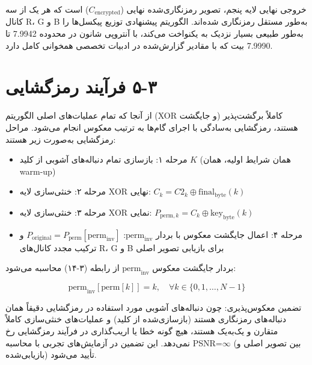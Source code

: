 خروجی نهایی لایه پنجم، تصویر رمزنگاری‌شده نهایی ($C_{\mathrm{encrypted}}$) است که هر یک از سه کانال R، G و B به‌طور مستقل رمزنگاری شده‌اند. الگوریتم پیشنهادی توزیع پیکسل‌ها را به‌طور طبیعی بسیار نزدیک به یکنواخت می‌کند، با آنتروپی شانون در محدوده 7.9942 تا 7.9990 بیت که با مقادیر گزارش‌شده در ادبیات تخصصی همخوانی کامل دارد.

\section{‏۳‏-‏۵‏ فرآیند رمزگشایی}

از آنجا که تمام عملیات‌های اصلی الگوریتم (XOR و جایگشت) کاملاً برگشت‌پذیر هستند، رمزگشایی به‌سادگی با اجرای گام‌ها به ترتیب معکوس انجام می‌شود. مراحل رمزگشایی به‌صورت زیر هستند:

\begin{itemize}
    \item مرحله ۱: بازسازی تمام دنباله‌های آشوبی از کلید $K$ (همان شرایط اولیه، همان warm-up)
\end{itemize}

\begin{itemize}
    \item مرحله ۲: خنثی‌سازی لایه XOR نهایی: $C_k = C2_k \oplus \mathrm{final}_{\mathrm{byte}}(k)$
\end{itemize}

\begin{itemize}
    \item مرحله ۳: خنثی‌سازی لایه XOR نمایی: $P_{\mathrm{perm},k} = C_k \oplus \mathrm{key}_{\mathrm{byte}}(k)$
\end{itemize}

\begin{itemize}
    \item مرحله ۴: اعمال جایگشت معکوس با بردار $\mathrm{perm}_{\mathrm{inv}}$: $P_{\mathrm{original}} = P_{\mathrm{perm}}[\mathrm{perm}_{\mathrm{inv}}]$ و ترکیب مجدد کانال‌های R، G و B برای بازیابی تصویر اصلی
\end{itemize}

بردار جایگشت معکوس $\mathrm{perm}_{\mathrm{inv}}$ از رابطه (‏۳‏-‏۱۴‏) محاسبه می‌شود:

\begin{equation}
\mathrm{perm}_{\mathrm{inv}}[\mathrm{perm}[k]] = k, \quad \forall k \in \{0,1,\ldots,N-1\}

\end{equation}

تضمین معکوس‌پذیری: چون دنباله‌های آشوبی مورد استفاده در رمزگشایی دقیقاً همان دنباله‌های رمزنگاری هستند (بازسازی‌شده از کلید) و عملیات‌های خنثی‌سازی کاملاً متقارن و یک‌به‌یک هستند، هیچ گونه خطا یا اریب‌گذاری در فرآیند رمزگشایی رخ نمی‌دهد. این تضمین در آزمایش‌های تجربی با محاسبه PSNR=$\infty$ (بین تصویر اصلی و بازیابی‌شده) تأیید می‌شود\cite{ref8}.

